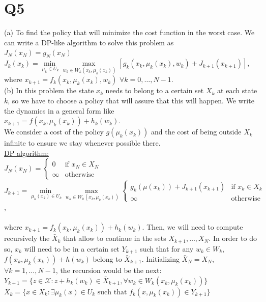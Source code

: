 \documentclass[11pt, english]{article}
\begin{document}
\section*{Q5}

(a) To find the policy that will minimize the cost function in the worst case. We can write a DP-like algorithm to solve this problem as\\
$J_N(x_N)=g_N(x_N)$\\
$J_k(x_k)=\underset{\mu_k\in U_k}{\min\ }\underset{w_k\in W_k(x_k,\mu_k(x_k))}{\max\ }[g_k(x_k,\mu_k(x_k),w_k)+J_{k+1}(x_{k+1})]$, where $x_{k+1}=f_k(x_k,\mu_k(x_k),w_k)$ $\forall k=0,\dots, N-1$.\\

(b) In this problem the state $x_k$ needs to belong to a certain set $X_k$ at each state $k$, so we have to choose a policy that will assure that this will happen. We write the dynamics in a general form like \\
$x_{k+1}=f(x_k,\mu_k(x_k))+h_k(w_k)$.\\
We consider a cost of the policy $g(\mu_k(x_k))$ and the cost of being outside $X_k$ infinite to ensure we stay whenever possible there.\\

\underline{DP algorithm:}\\

$J_N(x_N)=\left\{\begin{array}{ll}
0 & \text{if }x_N\in X_N\\
\infty & \text{otherwise}
\end{array}\right.$\\
$J_{k+1}=\underset{\mu_k(x_k)\in U_k}{\min\ }\underset{w_k\in W_k(x_k,\mu_k(x_k))}{\max\ }\left\{\begin{array}{ll}
g_k(\mu(x_k))+J_{k+1}(x_{k+1}) & \text{if } x_k\in X_k\\
\infty & \text{otherwise}
\end{array}\right.$,\\\\ where $x_{k+1}=f_k(x_k,\mu_k(x_k))+h_k(w_k)$. Then, we will need to compute recursively the $\bar{X}_k$ that allow to continue in the sets $X_{k+1},\dots,X_N$. In order to do so, $x_k$ will need to be in a certain set $Y_{k+1}$ such that for any $w_k\in W_k$, $f(x_k,\mu_k(x_k))+h(w_k)$ belong to $\bar{X}_{k+1}$. Initializing $\bar{X}_N=X_N$, $\forall k=1,\dots,N-1$, the recursion would be the next:\\

$Y_{k+1}=\{z\in \mathcal{X}: z+h_k(w_k)\in\bar{X}_{k+1},\forall w_k\in W_k(x_k,\mu_k(x_k))\}$\\

$\bar{X}_k=\{x\in X_k: \exists \mu_k(x)\in U_k\text{ such that }  f_k(x,\mu_k(x_k))\in Y_{k+1}\}$
\end{document}
